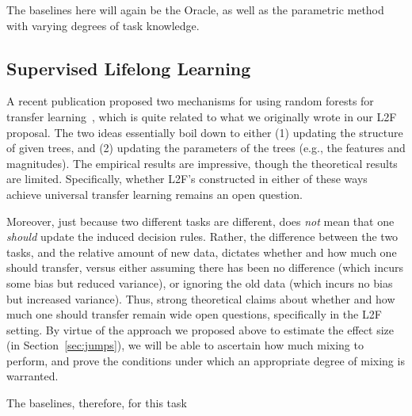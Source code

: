 \documentclass{article}
\begin{document}
The baselines here will again be the Oracle, as well as the parametric method with varying degrees of task knowledge. 


\subsection{Supervised Lifelong Learning}

A recent publication proposed two mechanisms for using random forests for transfer learning~\cite{Segev2016-pu}, which is quite related to what we originally wrote in our L2F proposal. The two ideas essentially boil down to either (1) updating the structure of given trees, and (2) updating the parameters of the trees (e.g., the features and magnitudes).  The empirical results are impressive, though the theoretical results are limited.  Specifically, whether L2F's constructed in either of these ways achieve universal transfer learning remains an open question.  

Moreover, just because two different tasks are different, does \emph{not} mean that one \emph{should} update the induced decision rules.  Rather, the difference between the two tasks, and the relative amount of new data, dictates whether and how much one should transfer, versus either assuming there has been no difference (which incurs some bias but reduced variance), or ignoring the old data (which incurs no bias but increased variance).  Thus, strong theoretical claims about whether and how much one should transfer remain wide open questions, specifically in the L2F setting.  By virtue of the approach we proposed above to estimate the effect size (in Section~\ref{sec:jumps}), we will be able to ascertain how much mixing to perform, and prove the conditions under which an appropriate degree of mixing is warranted. 

The baselines, therefore, for this task 
\end{document}
